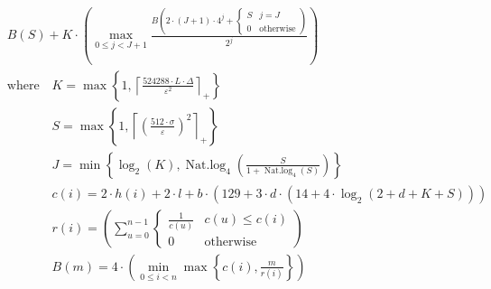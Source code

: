 \[\begin{aligned} &B\left(S\right) + K \cdot \left(\max_{0\le j<J + 1} \frac{B\left(2 \cdot \left(J + 1\right) \cdot 4^{j} + \begin{cases} S & j = J \\ 0 & \mathrm{otherwise} \end{cases}\right)}{2^{j}}\right) \\ &\text{where}\quad K = \max\left\{ 1, \left\lceil \frac{524288 \cdot L \cdot \Delta}{\varepsilon^{2}} \right\rceil_{+} \right\} \\ &\phantom{\text{where}\quad} S = \max\left\{ 1, \left\lceil \left(\frac{512 \cdot \sigma}{\varepsilon}\right)^{2} \right\rceil_{+} \right\} \\ &\phantom{\text{where}\quad} J = \min\left\{ \log_{2}\left(K\right), \operatorname{Nat.log}_{4}\left(\frac{S}{1 + \operatorname{Nat.log}_{4}\left(S\right)}\right) \right\} \\ &\phantom{\text{where}\quad} c\left(i\right) = 2 \cdot h\left(i\right) + 2 \cdot l + b \cdot \left(129 + 3 \cdot d \cdot \left(14 + 4 \cdot \log_{2}\left(2 + d + K + S\right)\right)\right) \\ &\phantom{\text{where}\quad} r\left(i\right) = \left(\sum_{u=0}^{n-1} \begin{cases} \frac{1}{c\left(u\right)} & c\left(u\right) \leq c\left(i\right) \\ 0 & \mathrm{otherwise} \end{cases}\right) \\ &\phantom{\text{where}\quad} B\left(m\right) = 4 \cdot \left(\min_{0\le i<n} \max\left\{ c\left(i\right), \frac{m}{r\left(i\right)} \right\}\right)\end{aligned}\]
